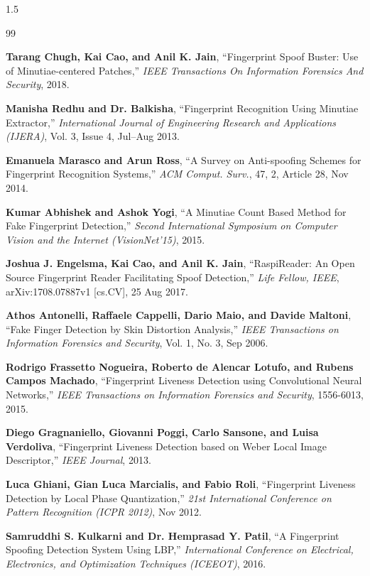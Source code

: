 \renewcommand{\bibname}{REFERENCES}
\cleardoublepage %
\begin{spacing}{1.5}
\begin{thebibliography}{99}

 \textbf{Tarang Chugh, Kai Cao, and Anil K. Jain}, ``Fingerprint Spoof Buster: Use of Minutiae-centered Patches,'' \textit{IEEE Transactions On Information Forensics And Security}, 2018.  

 \textbf{Manisha Redhu and Dr. Balkisha}, ``Fingerprint Recognition Using Minutiae Extractor,'' \textit{International Journal of Engineering Research and Applications (IJERA)}, Vol. 3, Issue 4, Jul--Aug 2013.

 \textbf{Emanuela Marasco and Arun Ross}, ``A Survey on Anti-spoofing Schemes for Fingerprint Recognition Systems,'' \textit{ACM Comput. Surv.}, 47, 2, Article 28, Nov 2014.

 \textbf{Kumar Abhishek and Ashok Yogi}, ``A Minutiae Count Based Method for Fake Fingerprint Detection,'' \textit{Second International Symposium on Computer Vision and the Internet (VisionNet'15)}, 2015.

 \textbf{Joshua J. Engelsma, Kai Cao, and Anil K. Jain}, ``RaspiReader: An Open Source Fingerprint Reader Facilitating Spoof Detection,'' \textit{Life Fellow, IEEE}, arXiv:1708.07887v1 [cs.CV], 25 Aug 2017.

 \textbf{Athos Antonelli, Raffaele Cappelli, Dario Maio, and Davide Maltoni}, ``Fake Finger Detection by Skin Distortion Analysis,'' \textit{IEEE Transactions on Information Forensics and Security}, Vol. 1, No. 3, Sep 2006.

 \textbf{Rodrigo Frassetto Nogueira, Roberto de Alencar Lotufo, and Rubens Campos Machado}, ``Fingerprint Liveness Detection using Convolutional Neural Networks,'' \textit{IEEE Transactions on Information Forensics and Security}, 1556-6013, 2015.

 \textbf{Diego Gragnaniello, Giovanni Poggi, Carlo Sansone, and Luisa Verdoliva}, ``Fingerprint Liveness Detection based on Weber Local Image Descriptor,'' \textit{IEEE Journal}, 2013.

 \textbf{Luca Ghiani, Gian Luca Marcialis, and Fabio Roli}, ``Fingerprint Liveness Detection by Local Phase Quantization,'' \textit{21st International Conference on Pattern Recognition (ICPR 2012)}, Nov 2012. 

 \textbf{Samruddhi S. Kulkarni and Dr. Hemprasad Y. Patil}, ``A Fingerprint Spoofing Detection System Using LBP,'' \textit{International Conference on Electrical, Electronics, and Optimization Techniques (ICEEOT)}, 2016.

\end{thebibliography}
\end{spacing}
	
\nocite{*}
